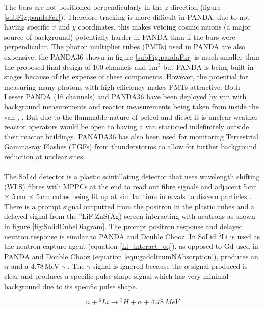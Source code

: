 The bars are not positioned perpendicularly in the $z$ direction (figure \ref{subFig:pandaFar}). Therefore tracking is more difficult in PANDA, due to not having specific $x$ and $y$ coordinates, this makes vetoing cosmic muons (a major source of background) potentially harder in PANDA than if the bars were perpendicular. The photon multiplier tubes (PMTs) used in PANDA are also expensive, the PANDA36 shown in figure \ref{subFig:pandaFar} is much smaller than the proposed final design of 100 channels and 1m$^3$ \cite{PANDA_2012} but PANDA is being built in stages because of the expense of these components. However, the potential for measuring many photons with high efficiency makes PMTs attractive. Both Lesser PANDA (16 channels) and PANDA36 have been deployed by van with background measurements and reactor measurements being taken from inside the van \cite{PANDA_2012}, \cite{PANDA_2014}. But due to the flammable nature of petrol and diesel it is unclear weather reactor operators would be open to having a van stationed indefinitely outside their reactor buildings. PANADA36 has also been used for monitoring Terrestrial Gamma-ray Flashes (TGFs) from thunderstorms to allow for further background reduction at nuclear sites\cite{PANDA_tgf}. 
\\\\The SoLid detector is a plastic scintillating detector that uses wavelength shifting (WLS) fibres with MPPCs at the end to read out fibre signals and adjacent 5\,cm $\times$ 5\,cm $\times$ 5\,cm cubes being lit up at similar time intervals to discern particles \cite{Solid_proposal}. There is a prompt signal outputted from the positron in the plastic cubes and a delayed signal from the $^6$LiF:ZnS(Ag) screen interacting with neutrons as shown in figure \ref{fig:SolidCubeDiagram}. The prompt positron response and delayed neutron response is similar to PANDA and Double Chooz. In SoLid $^6$Li is used as the neutron capture agent (equation \ref{Li_interact_eq}), as opposed to Gd used in PANDA and Double Chooz (equation \ref{equ:gadolinumNAbsorption}), produces an $\alpha$ and a 4.78\,MeV $\gamma$ \cite{Solid_readout}. The $\gamma$ signal is ignored because the $\alpha$ signal produced is clear and produces a specific pulse shape signal \cite{Solid_readout} which has very minimal background due to its specific pulse shape. 

\begin{equation}
n + {^6Li} \rightarrow {^3H} + \alpha +4.78\,MeV
\label{Li_interact_eq}
\end{equation}

